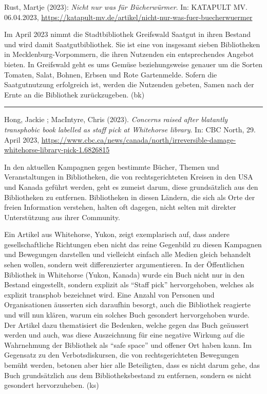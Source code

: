\documentclass[a4paper,
fontsize=11pt,
oneside,
numbers=noperiodatend,
parskip=half-,
bibliography=totoc,
final
]{scrartcl}
\begin{document}
Rust, Martje (2023): \emph{Nicht nur was für Bücherwürmer}. In: KATAPULT
MV. 06.04.2023,
\url{https://katapult-mv.de/artikel/nicht-nur-was-fuer-buecherwuermer}

Im April 2023 nimmt die Stadtbibliothek Greifswald Saatgut in ihren
Bestand und wird damit Saatgutbibliothek. Sie ist eine von insgesamt
sieben Bibliotheken in Mecklenburg-Vorpommern, die ihren Nutzenden ein
entsprechendes Angebot bieten. In Greifswald geht es ums Gemüse
beziehungsweise genauer um die Sorten Tomaten, Salat, Bohnen, Erbsen und
Rote Gartenmelde. Sofern die Saatgutnutzung erfolgreich ist, werden die
Nutzenden gebeten, Samen nach der Ernte an die Bibliothek zurückzugeben.
(bk)

\begin{center}\rule{0.5\linewidth}{0.5pt}\end{center}

Hong, Jackie ; MacIntyre, Chris (2023). \emph{Concerns raised after
\textquotesingle blatantly transphobic\textquotesingle{} book labelled
as staff pick at Whitehorse library}. In: CBC North, 29. April 2023,
\url{https://www.cbc.ca/news/canada/north/irreversible-damage-whitehorse-library-pick-1.6826815}

In den aktuellen Kampagnen gegen bestimmte Bücher, Themen und
Veranstaltungen in Bibliotheken, die von rechtsgerichteten Kreisen in
den USA und Kanada geführt werden, geht es zumeist darum, diese
grundsätzlich aus den Bibliotheken zu entfernen. Bibliotheken in diesen
Ländern, die sich als Orte der freien Information verstehen, halten oft
dagegen, nicht selten mit direkter Unterstützung aus ihrer Community.

Ein Artikel aus Whitehorse, Yukon, zeigt exemplarisch auf, dass andere
gesellschaftliche Richtungen eben nicht das reine Gegenbild zu diesen
Kampagnen und Bewegungen darstellen und vielleicht einfach alle Medien
gleich behandelt sehen wollen, sondern weit differenzierter
argumentieren. In der Öffentlichen Bibliothek in Whitehorse (Yukon,
Kanada) wurde ein Buch nicht nur in den Bestand eingestellt, sondern
explizit als \enquote{Staff pick} hervorgehoben, welches als explizit
transphob bezeichnet wird. Eine Anzahl von Personen und Organisationen
äusserten sich daraufhin besorgt, auch die Bibliothek reagierte und will
nun klären, warum ein solches Buch gesondert hervorgehoben wurde. Der
Artikel dazu thematisiert die Bedenken, welche gegen das Buch geäussert
werden und auch, was diese Auszeichnung für eine negative Wirkung auf
die Wahrnehmung der Bibliothek als \enquote{safe space} und offener Ort
haben kann. Im Gegensatz zu den Verbotsdiskursen, die von
rechtsgerichteten Bewegungen bemüht werden, betonen aber hier alle
Beteiligten, dass es nicht darum gehe, das Buch grundsätzlich aus dem
Bibliotheksbestand zu entfernen, sondern es nicht gesondert
hervorzuheben. (ks)
\end{document}
